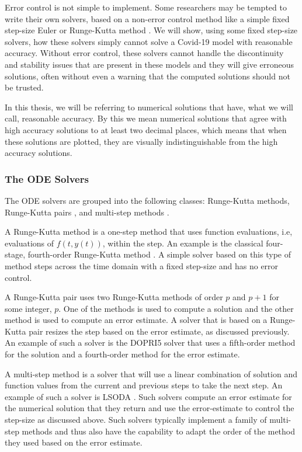 Error control is not simple to implement. Some researchers may be tempted to write their own solvers, based on a non-error control method like a simple fixed step-size Euler or Runge-Kutta method \cite{MR3822086}. We will show, using some fixed step-size solvers, how these solvers simply cannot solve a Covid-19 model with reasonable accuracy. Without error control, these solvers cannot handle the discontinuity and stability issues that are present in these models and they will give erroneous solutions, often without even a warning that the computed solutions should not be trusted.

In this thesis, we will be referring to numerical solutions that have, what we will call, reasonable accuracy. By this we mean numerical solutions that agree with high accuracy solutions to at least two decimal places, which means that when these solutions are plotted, they are visually indistinguishable from the high accuracy solutions.

\subsubsection{The ODE Solvers}
\label{subsection:numerical_software_used}
The ODE solvers are grouped into the following classes: Runge-Kutta methods, Runge-Kutta pairs \cite{MR3822086}, and multi-step methods \cite{MR3822086}.

A Runge-Kutta method is a one-step method that uses function evaluations, i.e, evaluations of $f(t, y(t))$, within the step. An example is the classical four-stage, fourth-order Runge-Kutta method \cite{MR3822086}. A simple solver based on this type of method steps across the time domain with a fixed step-size and has no error control.

A Runge-Kutta pair \cite{MR3822086} uses two Runge-Kutta methods of order $p$ and $p+1$ for some integer, $p$. One of the methods is used to compute a solution and the other method is used to compute an error estimate. A solver that is based on a Runge-Kutta pair resizes the step based on the error estimate, as discussed previously. An example of such a solver is the DOPRI5 solver \cite{MR3822086} that uses a fifth-order method for the solution and a fourth-order method for the error estimate.

A multi-step method is a solver that will use a linear combination of solution and function values from the current and previous steps to take the next step. An example of such a solver is LSODA \cite{MR3822086}. Such solvers compute an error estimate for the numerical solution that they return and use the error-estimate to control the step-size as discussed above. Such solvers typically implement a family of multi-step methods and thus also have the capability to adapt the order of the method they used based on the error estimate.

